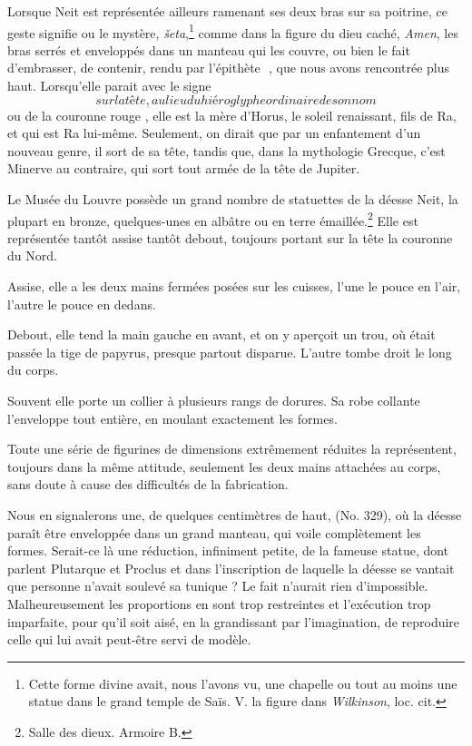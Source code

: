 \documentclass[letterpaper,twocolumn,openany,nodeprecatedcode]{dndbook}
\newcommand*\hieroAAAH{}
\newcommand*\hieroAAAO{}
\newcommand*\hieroAACI{}
\newcommand*\hieroAAIL{}
\newcommand*\hieroABFY{\raisebox{0.3ex}{}}
\begin{document}
Lorsque Neit est représentée ailleurs ramenant ses deux bras sur sa poitrine, ce geste signifie ou le mystère, \emph{šeta},\footnote{Cette forme divine avait, nous l'avons vu, une chapelle ou tout au moins une statue dans le grand temple de Saïs. V. la figure dans \emph{Wilkinson}, loc. cit.} comme dans la figure du dieu caché, \emph{Amen}, les bras serrés et enveloppés dans un manteau qui les couvre, ou bien le fait d'embrasser, de contenir, rendu par l'épithète $\hieroAAAH\:\hieroABFY$, que nous avons rencontrée plus haut. Lorsqu'elle parait avec le signe $\hieroAACI$ sur la tête, au lieu du hiéroglyphe ordinaire de son nom $\hieroAAAO$ ou de la couronne rouge $\hieroAAIL$, elle est la mère d'Horus, le soleil renaissant, fils de Ra, et qui est Ra lui-même. Seulement, on dirait que par un enfantement d'un nouveau genre, il sort de sa tête, tandis que, dans la mythologie Grecque, c'est Minerve au contraire, qui sort tout armée de la tête de Jupiter.

Le Musée du Louvre possède un grand nombre de statuettes de la déesse Neit, la plupart en bronze, quelques-unes en albâtre ou en terre émaillée.\footnote{Salle des dieux. Armoire B.} Elle est représentée tantôt assise tantôt debout, toujours portant sur la tête la couronne du Nord.

Assise, elle a les deux mains fermées posées sur les cuisses, l'une le pouce en l'air, l'autre le pouce en dedans.

Debout, elle tend la main gauche en avant, et on y aperçoit un trou, où était passée la tige de papyrus, presque partout disparue. L'autre tombe droit le long du corps.

Souvent elle porte un collier à plusieurs rangs de dorures. Sa robe collante l'enveloppe tout entière, en moulant exactement les formes.

Toute une série de figurines de dimensions extrêmement réduites la représentent, toujours dans la même attitude, seulement les deux mains attachées au corps, sans doute à cause des difficultés de la fabrication.

Nous en signalerons une, de quelques centimètres de haut, (No. 329), où la déesse paraît être enveloppée dans un grand manteau, qui voile complètement les formes. Serait-ce là une réduction, infiniment petite, de la fameuse statue, dont parlent Plutarque et Proclus et dans l'inscription de laquelle la déesse se vantait que personne n'avait soulevé sa tunique ? Le fait n'aurait rien d'impossible. Malheureusement les proportions en sont trop restreintes et l'exécution trop imparfaite, pour qu'il soit aisé, en la grandissant par l'imagination, de reproduire celle qui lui avait peut-être servi de modèle.
\end{document}
